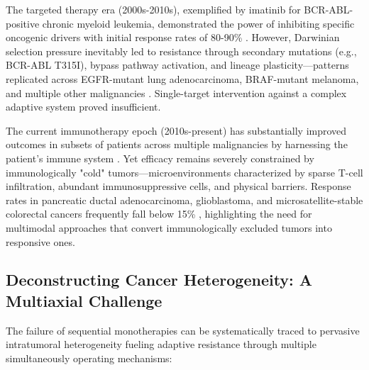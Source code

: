 \documentclass[12pt,a4paper]{article}
\begin{document}
The targeted therapy era (2000s-2010s), exemplified by imatinib for BCR-ABL-positive chronic myeloid leukemia, demonstrated the power of inhibiting specific oncogenic drivers with initial response rates of 80-90\% \citep{sawyers2004}. However, Darwinian selection pressure inevitably led to resistance through secondary mutations (e.g., BCR-ABL T315I), bypass pathway activation, and lineage plasticity—patterns replicated across EGFR-mutant lung adenocarcinoma, BRAF-mutant melanoma, and multiple other malignancies \citep{sharma2022}. Single-target intervention against a complex adaptive system proved insufficient.

The current immunotherapy epoch (2010s-present) has substantially improved outcomes in subsets of patients across multiple malignancies by harnessing the patient's immune system \citep{ribas2018}. Yet efficacy remains severely constrained by immunologically "cold" tumors—microenvironments characterized by sparse T-cell infiltration, abundant immunosuppressive cells, and physical barriers. Response rates in pancreatic ductal adenocarcinoma, glioblastoma, and microsatellite-stable colorectal cancers frequently fall below 15\% \citep{hegde2021}, highlighting the need for multimodal approaches that convert immunologically excluded tumors into responsive ones.

\subsection{Deconstructing Cancer Heterogeneity: A Multiaxial Challenge}

The failure of sequential monotherapies can be systematically traced to pervasive intratumoral heterogeneity fueling adaptive resistance through multiple simultaneously operating mechanisms:
\end{document}
